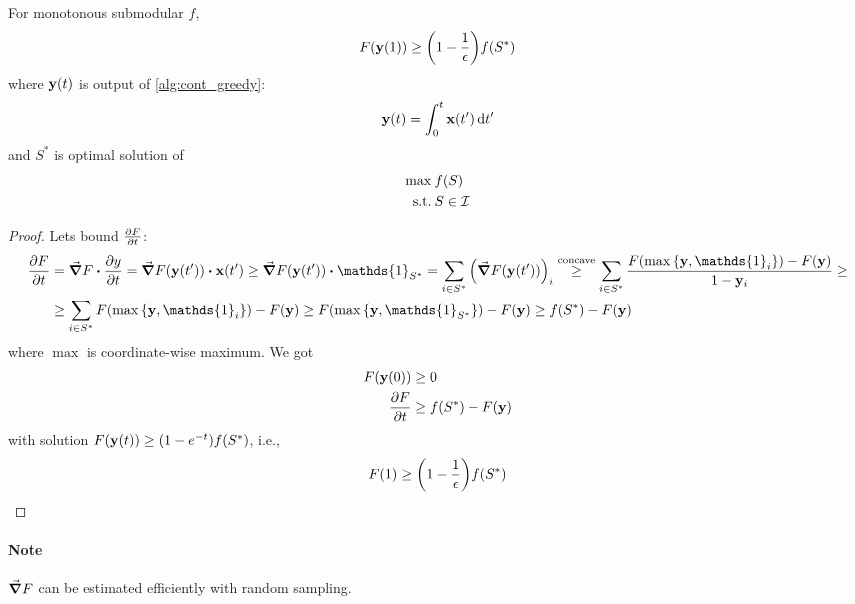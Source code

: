 \begin{theorem}
	For monotonous submodular $f$,
	\begin{align}
	F(\vb{y}(1)) \geq \qty(1-\frac{1}{\epsilon})f(S^*)
	\end{align}
	where $\vb{y}(t)$ is output of \vref{alg:cont_greedy}:
	\begin{align}
	\vb{y}(t) = \int_0^t \vb{x}(t') \dd{t'}
	\end{align}
	and $S^*$ is optimal solution of
	\begin{align}
	\max \: & f(S)\\
	\text{s.t.} \: & S\in \mathcal{I}
	\end{align}
	\begin{proof}
		Lets bound $\pdv{F}{t} (\vb{y}(t'))$:
		\begin{align}
		\pdv{F}{t} (\vb{y}(t')) &=  \grad{F} \vdot \pdv{y}{t} =  \grad{F\qty(\vb{y}(t'))} \vdot \vb{x}(t') \geq \grad{F\qty(\vb{y}(t'))} \vdot \mathds{1}_{S^*}= \sum_{i \in S^*} \qty(\grad{F\qty(\vb{y}(t'))})_i \stackrel{\text{concave}}{\geq} \sum_{i \in S^*} \frac{F\qty(\max\qty{\vb{y}, \mathds{1}_i})-F(\vb{y})}{1-\vb{y}_i} \geq\\&\geq \sum_{i \in S^*} F\qty(\max\qty{\vb{y}, \mathds{1}_i})-F(\vb{y}) \geq F\qty(\max\qty{\vb{y}, \mathds{1}_{S^*}})-F(\vb{y}) \geq f(S^*)-F(\vb{y})
		\end{align}
		where $\max$ is coordinate-wise maximum.
		We got
		\begin{align}
			F(\vb{y}(0)) &\geq 0 \\
			\pdv{F}{t} &\geq f(S^*) - F(\vb{y})
		\end{align}
		with solution $F(\vb{y}(t)) \geq \qty(1-e^{-t}) f(S^*)$, i.e., 
		\begin{align}
		F(1) \geq \qty(1-\frac{1}{\epsilon})f(S^*)
		\end{align}
	\end{proof}
\end{theorem}
\paragraph{Note} $\grad F$ can be estimated efficiently with random sampling.